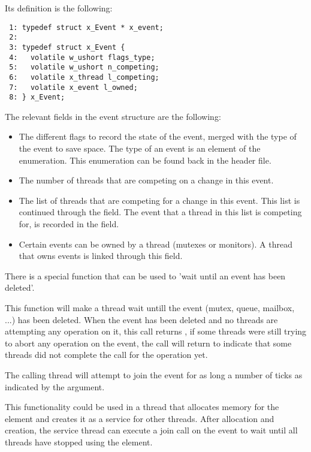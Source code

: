 Its definition is the following:

\bcode
\begin{verbatim}
 1: typedef struct x_Event * x_event;
 2:
 3: typedef struct x_Event {
 4:   volatile w_ushort flags_type;
 5:   volatile w_ushort n_competing;
 6:   volatile x_thread l_competing;
 7:   volatile x_event l_owned;
 8: } x_Event;
\end{verbatim}
\ecode

The relevant fields in the event structure are the following:

\begin{itemize}
\item {} The different flags to record the
state of the event, merged with the type of the event to save space. The type of an event is an
element of the  enumeration. This enumeration can be found
back in the  header file.
\item {} The number of threads that
are competing on a change in this event.
\item {}
The list of threads that are competing for a change in this event. This list
is continued through the  field.
The event that a thread in this list is competing for, is recorded in the
 field.
\item {} Certain events can be owned by
a thread (mutexes or monitors). A thread that owns events is linked through
this field.
\end{itemize}

There is a special function that can be used to 'wait until an event has
been deleted'.


This function will make a thread wait untill the event (mutex, queue,
mailbox, ...) has been deleted. When the event has been deleted and no
threads are attempting any operation on it, this call returns
, if some threads were still trying to abort any
operation on the event, the call will return  to
indicate that some threads did not complete the call for the operation yet.

The calling thread will attempt to join the event for as long a number of
ticks as indicated by the  argument.

This functionality could be used in a thread that allocates memory for the
element and creates it as a service for other threads. After allocation and
creation, the service thread can execute a join call on the event to wait until
all threads have stopped using the element.
